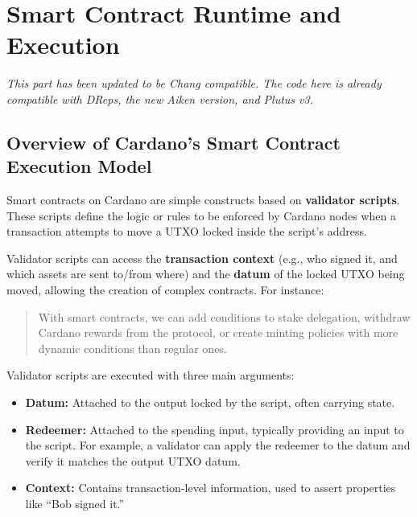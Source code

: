 \section{Smart Contract Runtime and Execution} \label{sec:Runtime}


\textit{This part has been updated to be Chang compatible. The code here is already compatible with DReps, the new Aiken version, and Plutus v3.}

\subsection{Overview of Cardano's Smart Contract Execution Model}

Smart contracts on Cardano are simple constructs based on \textbf{validator scripts}. These scripts define the logic or rules to be enforced by Cardano nodes when a transaction attempts to move a UTXO locked inside the script's address.

Validator scripts can access the \textbf{transaction context} (e.g., who signed it, and which assets are sent to/from where) and the \textbf{datum} of the locked UTXO being moved, allowing the creation of complex contracts. For instance:
\begin{quote}
With smart contracts, we can add conditions to stake delegation, withdraw Cardano rewards from the protocol, or create minting policies with more dynamic conditions than regular ones.
\end{quote}

Validator scripts are executed with three main arguments:
\begin{itemize}
    \item \textbf{Datum:} Attached to the output locked by the script, often carrying state.
    \item \textbf{Redeemer:} Attached to the spending input, typically providing an input to the script. For example, a validator can apply the redeemer to the datum and verify it matches the output UTXO datum.
    \item \textbf{Context:} Contains transaction-level information, used to assert properties like “Bob signed it.”
\end{itemize}

